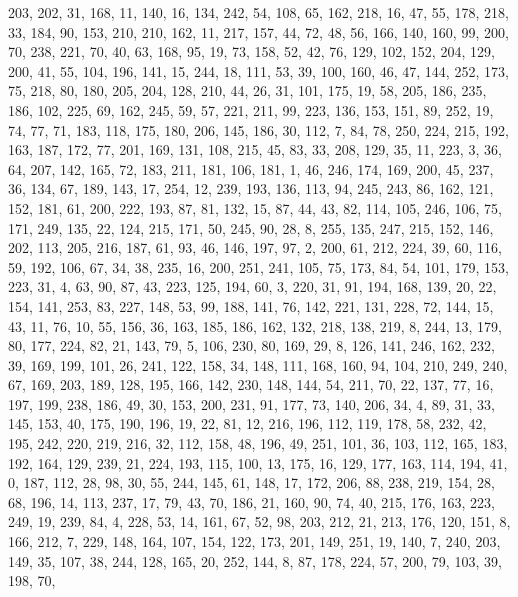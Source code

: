 \begin{DoxyCode}
       203, 202, 31, 168, 11, 140, 16, 134, 242, 54, 108, 65, 162, 218, 16, 47, 55, 178, 218, 33, 184, 90, 153, 210,
       210, 162, 11, 217, 157, 44, 72, 48, 56, 166, 140, 160, 99, 200, 70, 238, 221, 70, 40, 63, 168, 95, 19, 73,
       158, 52, 42, 76, 129, 102, 152, 204, 129, 200, 41, 55, 104, 196, 141, 15, 244, 18, 111, 53, 39, 100, 160,
       46, 47, 144, 252, 173, 75, 218, 80, 180, 205, 204, 128, 210, 44, 26, 31, 101, 175, 19, 58, 205, 186, 235, 186,
       102, 225, 69, 162, 245, 59, 57, 221, 211, 99, 223, 136, 153, 151, 89, 252, 19, 74, 77, 71, 183, 118, 175,
       180, 206, 145, 186, 30, 112, 7, 84, 78, 250, 224, 215, 192, 163, 187, 172, 77, 201, 169, 131, 108, 215, 45,
       83, 33, 208, 129, 35, 11, 223, 3, 36, 64, 207, 142, 165, 72, 183, 211, 181, 106, 181, 1, 46, 246, 174, 169,
       200, 45, 237, 36, 134, 67, 189, 143, 17, 254, 12, 239, 193, 136, 113, 94, 245, 243, 86, 162, 121, 152, 181,
       61, 200, 222, 193, 87, 81, 132, 15, 87, 44, 43, 82, 114, 105, 246, 106, 75, 171, 249, 135, 22, 124, 215, 171,
       50, 245, 90, 28, 8, 255, 135, 247, 215, 152, 146, 202, 113, 205, 216, 187, 61, 93, 46, 146, 197, 97, 2,
       200, 61, 212, 224, 39, 60, 116, 59, 192, 106, 67, 34, 38, 235, 16, 200, 251, 241, 105, 75, 173, 84, 54, 101,
       179, 153, 223, 31, 4, 63, 90, 87, 43, 223, 125, 194, 60, 3, 220, 31, 91, 194, 168, 139, 20, 22, 154, 141, 253,
       83, 227, 148, 53, 99, 188, 141, 76, 142, 221, 131, 228, 72, 144, 15, 43, 11, 76, 10, 55, 156, 36, 163, 185,
       186, 162, 132, 218, 138, 219, 8, 244, 13, 179, 80, 177, 224, 82, 21, 143, 79, 5, 106, 230, 80, 169, 29, 8,
       126, 141, 246, 162, 232, 39, 169, 199, 101, 26, 241, 122, 158, 34, 148, 111, 168, 160, 94, 104, 210, 249,
       240, 67, 169, 203, 189, 128, 195, 166, 142, 230, 148, 144, 54, 211, 70, 22, 137, 77, 16, 197, 199, 238, 186,
       49, 30, 153, 200, 231, 91, 177, 73, 140, 206, 34, 4, 89, 31, 33, 145, 153, 40, 175, 190, 196, 19, 22, 81, 12,
       216, 196, 112, 119, 178, 58, 232, 42, 195, 242, 220, 219, 216, 32, 112, 158, 48, 196, 49, 251, 101, 36,
       103, 112, 165, 183, 192, 164, 129, 239, 21, 224, 193, 115, 100, 13, 175, 16, 129, 177, 163, 114, 194, 41, 0,
       187, 112, 28, 98, 30, 55, 244, 145, 61, 148, 17, 172, 206, 88, 238, 219, 154, 28, 68, 196, 14, 113, 237, 17,
       79, 43, 70, 186, 21, 160, 90, 74, 40, 215, 176, 163, 223, 249, 19, 239, 84, 4, 228, 53, 14, 161, 67, 52, 98,
       203, 212, 21, 213, 176, 120, 151, 8, 166, 212, 7, 229, 148, 164, 107, 154, 122, 173, 201, 149, 251, 19, 140,
       7, 240, 203, 149, 35, 107, 38, 244, 128, 165, 20, 252, 144, 8, 87, 178, 224, 57, 200, 79, 103, 39, 198, 70,

\end{DoxyCode}
